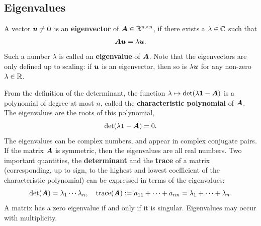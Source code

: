 \subsection{Eigenvalues}
A vector $\bm{u}\neq \bm{0}$ is an \textbf{eigenvector} of $\bm{A}\in \mathbb{R}^{n\times n}$, if there exists a $\lambda\in \mathbb{C}$ such that
\begin{equation*}
 \bm{A}\bm{u} = \lambda \bm{u}.
\end{equation*}
Such a number $\lambda$ is called an \textbf{eigenvalue} of $\bm{A}$. Note that the eigenvectors are only defined up to scaling: if $\bm{u}$ is an eigenvector, then so is $\lambda \bm{u}$ for any non-zero $\lambda\in \mathbb{R}$.

From the definition of the determinant, the function
$\lambda \mapsto \det(\lambda \bm{1}-\bm{A})$ is a polynomial of degree at most $n$, called the \textbf{characteristic polynomial} of $\bm{A}$. The eigenvalues are the roots of \strictpagecheck{} this polynomial,
\begin{equation*}
 \det(\lambda \bm{1}-\bm{A}) = 0.
\end{equation*}
The eigenvalues can be complex numbers, and appear in complex conjugate pairs. If the matrix $\bm{A}$ is symmetric, then the eigenvalues are all real numbers. Two important quantities, the \textbf{determinant} and the \textbf{trace} of a matrix (corresponding, up to sign, to the highest and lowest coefficient of the characteristic polynomial) can be expressed in terms of the eigenvalues:
\begin{equation*}
 \det(\bm{A}) = \lambda_1\cdots \lambda_n, \quad \mathrm{trace}(\bm{A}) := a_{11}+\cdots +a_{nn} = \lambda_1+\cdots+\lambda_n.
\end{equation*}
A matrix has a zero eigenvalue if and only if it is singular. Eigenvalues may occur with multiplicity. 

